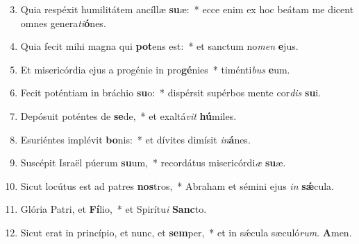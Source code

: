 \begin{enumerate}
\setcounter{enumi}{2}

\item Quia respéxit humilitátem ancíllæ \textbf{su}æ:~* ecce enim ex hoc beátam me dicent omnes genera\textit{ti}\textbf{ó}nes.

\item Quia fecit mihi magna qui \textbf{pot}ens est:~* et sanctum no\textit{men} \textbf{e}jus.

\item Et misericórdia ejus a progénie in pro\textbf{gé}nies~* timénti\textit{bus} \textbf{e}um.

\item Fecit poténtiam in bráchio \textbf{su}o:~* dispérsit supérbos mente cor\textit{dis} \textbf{su}i.

\item Depósuit poténtes de \textbf{se}de,~* et exaltá\textit{vit} \textbf{hú}miles.

\item Esuriéntes implévit \textbf{bo}nis:~* et dívites dimísit \textit{in}\textbf{á}nes.

\item Suscépit Israël púerum \textbf{su}um,~* recordátus misericórdi\textit{æ} \textbf{su}æ.

\item Sicut locútus est ad patres \textbf{nos}tros,~* Abraham et sémini ejus \textit{in} \textbf{sǽ}cula.

\item Glória Patri, et \textbf{Fí}lio,~* et Spirítu\textit{i} \textbf{Sanc}to.

\item Sicut erat in princípio, et nunc, et \textbf{sem}per,~* et in sǽcula sæculó\textit{rum}. \textbf{A}men.

\end{enumerate}
